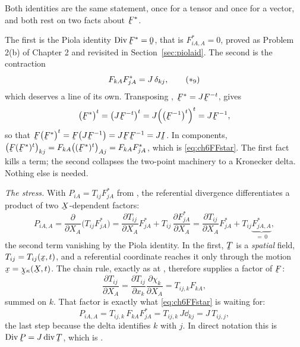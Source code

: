 \begin{solution}
Both identities are the same statement, once for a tensor and once for
a vector, and both rest on two facts about $\bF^{*}$.

The first is the Piola identity $\Dvg\bF^{*}=\bze$, that is
$F^{*}_{iA,A}=0$, proved as Problem 2(b) of Chapter 2 and revisited in
Section~\ref{sec:piolaid}. The second is the contraction
\begin{equation}
   F_{kA}F^{*}_{jA}=J\,\dd_{kj} ,
   \tag{$\ast_{9}$}\label{eq:ch6FFstar}
\end{equation}
which deserves a line of its own. Transposing ,
$\bF^{*}=J\bF^{-t}$, gives
\[
   \big(\bF^{*}\big)^{t}=\big(J\bF^{-t}\big)^{t}
   =J\Big(\big(\bF^{-1}\big)^{t}\Big)^{t}=J\bF^{-1} ,
\]
so that $\bF\big(\bF^{*}\big)^{t}=\bF\big(J\bF^{-1}\big)
=J\bF\bF^{-1}=J\I$. In components,
$\big(\bF(\bF^{*})^{t}\big)_{kj}
=F_{kA}\big((\bF^{*})^{t}\big)_{Aj}=F_{kA}F^{*}_{jA}$, which is
\eqref{eq:ch6FFstar}. The first fact kills a term; the second collapses
the two-point machinery to a Kronecker delta. Nothing else is needed.

\medskip
\noindent\emph{The stress.}
With $P_{iA}=T_{ij}F^{*}_{jA}$ from , the referential
divergence differentiates a product of two $\bX$-dependent factors:
\[
   P_{iA,A}=\frac{\partial}{\partial X_{A}}
   \big(T_{ij}F^{*}_{jA}\big)
   =\frac{\partial T_{ij}}{\partial X_{A}}F^{*}_{jA}
   +T_{ij}\,\frac{\partial F^{*}_{jA}}{\partial X_{A}}
   =\frac{\partial T_{ij}}{\partial X_{A}}F^{*}_{jA}
   +T_{ij}\underbrace{F^{*}_{jA,A}}_{=\,0} ,
\]
the second term vanishing by the Piola identity. In the first, $\bT$ is
a \emph{spatial} field, $T_{ij}=T_{ij}(\bx,t)$, and a referential
coordinate reaches it only through the motion
$\bx=\bchi_{\kappa}(\bX,t)$. The chain rule, exactly as at ,
therefore supplies a factor of $\bF$:
\[
   \frac{\partial T_{ij}}{\partial X_{A}}
   =\frac{\partial T_{ij}}{\partial x_{k}}
    \frac{\partial\chi_{k}}{\partial X_{A}}
   =T_{ij,k}F_{kA} ,
\]
summed on $k$. That factor is exactly what \eqref{eq:ch6FFstar} is
waiting for:
\[
   P_{iA,A}=T_{ij,k}\,F_{kA}F^{*}_{jA}
   =T_{ij,k}\,J\dd_{kj}
   =J\,T_{ij,j} ,
\]
the last step because the delta identifies $k$ with $j$. In direct
notation this is $\Dvg\bP=J\dvg\bT$, which is .



\end{solution}
